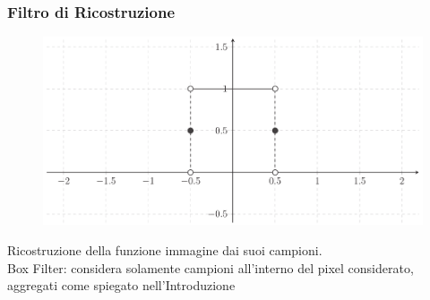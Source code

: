 \documentclass[14pt, aspectratio=169]{beamer}
\theoremstyle{theoremdd}
\begin{document}
\begin{frame}
{\begin{columns}
\begin{column}{0.65\textwidth}
\begin{itemize}[topsep=0.1pt,noitemsep]
			\end{itemize}
			\end{column}
			\end{columns}
		}
	\end{frame}
	
	\begin{frame}\frametitle{Filtro di Ricostruzione}
		\begin{figure}[tb]
			\centering 
			\includegraphics[width=0.6\linewidth]{../assets/chapter5_reconstruction_box.png}
		\end{figure}
		Ricostruzione della funzione immagine dai suoi campioni.\\
		\textsf{Box Filter}: considera solamente campioni all'interno del pixel considerato, aggregati come spiegato nell'Introduzione
	\end{frame}

\end{document}
